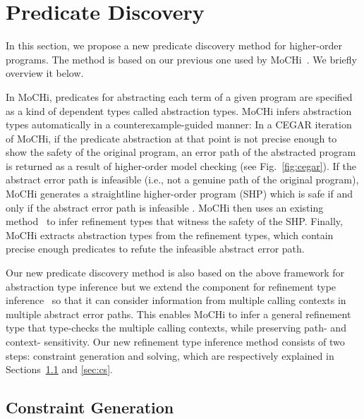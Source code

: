 

\section{Predicate Discovery}

In this section, we propose a new predicate discovery method for 
higher-order programs.  The method is based on our previous one used by 
MoCHi~\cite{KobayashiPLDI2011}.  We briefly overview it below.

In MoCHi, predicates for abstracting each term of a given program are 
specified as a kind of dependent types called abstraction types.  MoCHi 
infers abstraction types automatically in a counterexample-guided manner: 
 In a CEGAR iteration of MoCHi, if the predicate abstraction at that 
point is not precise enough to show the safety of the original program, 
an error path of the abstracted program is returned as a result of 
higher-order model checking (see Fig.~\ref{fig:cegar}).  If the abstract 
error path is infeasible (i.e., not a genuine path of the original 
program), MoCHi generates a straightline higher-order program (SHP) 
which is safe if and only if the abstract error path is infeasible .  
MoCHi then uses an existing method~\cite{Unno2009} to infer refinement 
types that witness the safety of the SHP.  Finally, MoCHi extracts 
abstraction types from the refinement types, which contain precise 
enough predicates to refute the infeasible abstract error path.

Our new predicate discovery method is also based on the above framework 
for abstraction type inference but we extend the component for 
refinement type inference~\cite{Unno2009} so that it can consider 
information from multiple calling contexts in multiple abstract error 
paths.  This enables MoCHi to infer a general refinement type that 
type-checks the multiple calling contexts, while preserving path- and 
context- sensitivity.  Our new refinement type inference method consists 
of two steps: constraint generation and solving, which are respectively 
explained in Sections~\ref{sec:cg} and \ref{sec:cs}.

\subsection{Constraint Generation}
\label{sec:cg}

